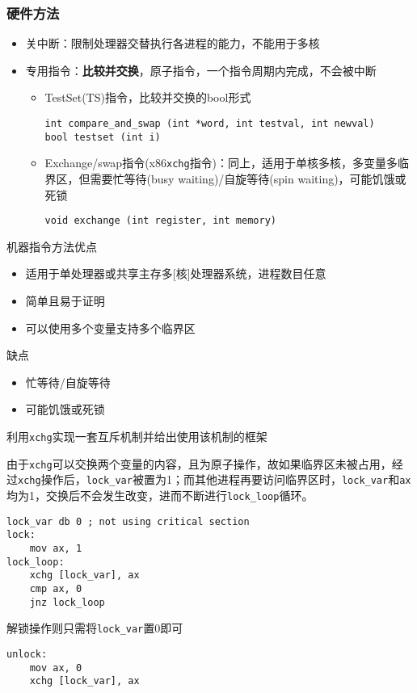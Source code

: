 \subsubsection{硬件方法}
\begin{itemize}
    \item 关中断：限制处理器交替执行各进程的能力，不能用于多核
    \item 专用指令：\textbf{比较并交换}，原子指令，一个指令周期内完成，不会被中断
    \begin{itemize}
        \item TestSet(TS)指令，比较并交换的bool形式
\begin{lstlisting}
int compare_and_swap (int *word, int testval, int newval)
bool testset (int i)
\end{lstlisting}
        \item Exchange/swap指令(x86\verb'xchg'指令)：同上，适用于单核多核，多变量多临界区，但需要忙等待(busy waiting)/自旋等待(spin waiting)，可能饥饿或死锁
\begin{lstlisting}
void exchange (int register, int memory)
\end{lstlisting}
    \end{itemize}
\end{itemize}

机器指令方法优点
\begin{itemize}
    \item 适用于单处理器或共享主存多[核]处理器系统，进程数目任意
    \item 简单且易于证明
    \item 可以使用多个变量支持多个临界区
\end{itemize}
缺点
\begin{itemize}
    \item 忙等待/自旋等待
    \item 可能饥饿或死锁
\end{itemize}

\begin{example}
    利用\verb'xchg'实现一套互斥机制并给出使用该机制的框架
\end{example}
\begin{analysis}
    由于\verb'xchg'可以交换两个变量的内容，且为原子操作，故如果临界区未被占用，经过\verb'xchg'操作后，\verb'lock_var'被置为1；而其他进程再要访问临界区时，\verb'lock_var'和\verb'ax'均为1，交换后不会发生改变，进而不断进行\verb'lock_loop'循环。
\begin{lstlisting}[language={[x86masm]Assembler}]
    lock_var db 0 ; not using critical section
lock:
    mov ax, 1
lock_loop:
    xchg [lock_var], ax
    cmp ax, 0
    jnz lock_loop
\end{lstlisting}
    解锁操作则只需将\verb'lock_var'置0即可
\begin{lstlisting}[language={[x86masm]Assembler}]
unlock:
    mov ax, 0
    xchg [lock_var], ax
\end{lstlisting}
\end{analysis}

